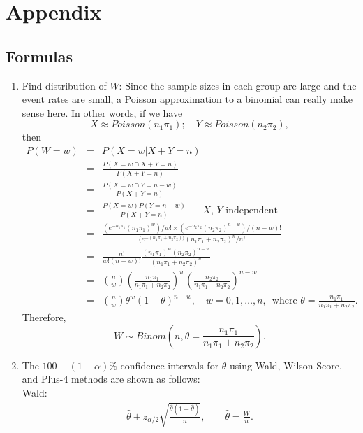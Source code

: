 \documentclass[12pt]{amsart}
\begin{document}
 
 



\section{Appendix}
\subsection{Formulas} 
\label{sec: 4intervals} 
\begin{enumerate}
    \item Find distribution of $W$:  
    Since the sample sizes in each group are large and the event rates are small, a Poisson approximation to a binomial can really make sense here. In other words, if we have
    $$X \approx Poisson(n_1\pi_1); \quad Y \approx Poisson(n_2\pi_2),$$
    then 
    \begin{eqnarray*}
      P(W=w) &=& P(X=w | X+Y = n) \\
      &=& \frac{P(X=w \cap X+Y=n)}{P(X+Y=n)} \\
      &=& \frac{P(X=w \cap Y=n-w)}{P(X+Y=n)} \\
      &=& \frac{P(X=w)P(Y=n-w)}{P(X+Y=n)} \quad \text{ $X$, $Y$ independent} \\
      &=& \frac{(e^{-n_1\pi_1}(n_1\pi_1)^w)/w! \times (e^{-n_2\pi_2}(n_2\pi_2)^{n-w})/(n-w)!}{(e^{-(n_1\pi_1 + n_2\pi_2))}(n_1\pi_1+n_2\pi_2)^n/n!} \\
      &=& \frac{n!}{w!(n-w)!} \frac{(n_1\pi_1)^w (n_2\pi_2)^{n-w}}{(n_1\pi_1+n_2\pi_2)^n} \\
      &=& {n \choose w} \left( \frac{n_1\pi_1}{n_1\pi_1+n_2\pi_2} \right)^w \left( \frac{n_2\pi_2}{n_1\pi_1+n_2\pi_2} \right)^{n-w} \\
      &=& {n \choose w} \theta^w (1-\theta)^{n-w}, \quad w = 0, 1, \dots, n, \, \text{ where } \theta =  \frac{n_1\pi_1}{n_1\pi_1+n_2\pi_2}.
    \end{eqnarray*}
    Therefore, 
    \begin{equation}
      W \sim Binom \left( n, \theta = \frac{n_1\pi_1}{n_1\pi_1+n_2\pi_2} \right). \label{eq:w}
    \end{equation}
    \item The $100-(1-\alpha)\%$ confidence intervals for $\theta$ using Wald, Wilson Score, and Plus-4 methods are shown as follows: \\
    Wald: 
    \begin{align}
        \widehat{\theta} \pm z_{\alpha/2} \sqrt{\frac{\widehat{\theta}(1-\widehat{\theta})}{n}}, \qquad \widehat{\theta} = \frac{W}{n}.

\end{align}
\end{enumerate}
\end{document}
